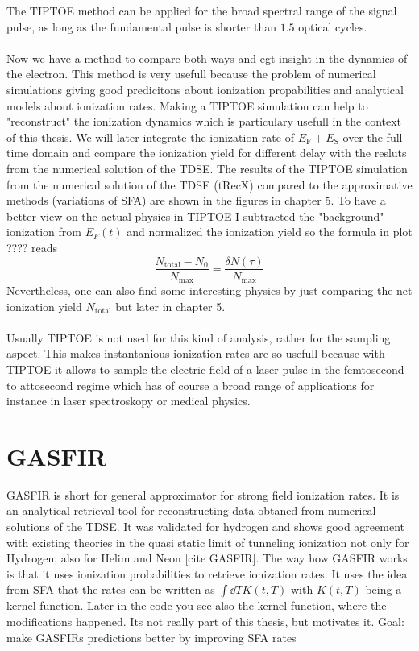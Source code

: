 The TIPTOE method can be applied for the broad spectral range of the signal pulse, as long as the fundamental pulse is shorter than $1.5$ optical cycles.\\\\
Now we have a method to compare both ways and egt insight in the dynamics of the electron. 
This method is very usefull because the problem of numerical simulations giving good predicitons about ionization propabilities and analytical models about ionization rates.
Making a TIPTOE simulation can help to "reconstruct" the ionization dynamics which is particulary usefull in the context of this thesis.
We will later integrate the ionization rate of $E_{\mathrm{F}}+E_{\mathrm{S}}$ over the full time domain and compare the ionization yield for different delay with the resluts from the numerical solution of the TDSE.
The results of the TIPTOE simulation from the numerical solution of the TDSE (tRecX) compared to the approximative methods (variations of SFA) are shown in the figures in chapter 5.
To have a better view on the actual physics in TIPTOE I subtracted the "background" ionization from $E_F(t)$ and normalized the ionization yield so the formula in plot ???? reads
\begin{equation*}
    \frac{N_{\mathrm{total}}-N_0}{N_{\mathrm{max}}}=\frac{\delta N(\tau)}{N_{\mathrm{max}}}
\end{equation*}
Nevertheless, one can also find some interesting physics by just comparing the net ionization yield $N_{\mathrm{total}}$ but later in chapter 5.\\\\
Usually TIPTOE is not used for this kind of analysis, rather for the sampling aspect.
This makes instantanious ionization rates are so usefull because with TIPTOE it allows to sample the electric field of a laser pulse in the femtosecond to attosecond regime which has of course a broad range of applications for instance in laser spectroskopy or medical physics.





\section{GASFIR}
GASFIR is short for general approximator for strong field ionization rates.
It is an analytical retrieval tool for reconstructing data obtaned from numerical solutions of the TDSE. 
It was validated for hydrogen and shows good agreement with existing theories in the quasi static limit of tunneling ionization not only for Hydrogen, also for Helim and Neon [cite GASFIR].
The way how GASFIR works is that it uses ionization probabilities to retrieve ionization rates. 
It uses the idea from SFA that the rates can be written as $\int \dd T K(t,T)$ with $K(t,T)$ being a kernel function.
Later in the code you see also the kernel function, where the modifications happened. 
Its not really part of this thesis, but motivates it.
Goal: make GASFIRs predictions better by improving SFA rates




